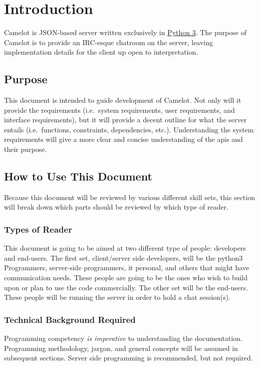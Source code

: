 \chapter{Introduction}\label{introduction}
Camelot is JSON-based server written exclusively in \href{https://www.python.org/about/}{Python 3}. The purpose of Camelot is to provide an IRC-esque chatroom on the server, leaving implementation details for the client up open to interpretation.

\section{Purpose}\label{purpose}
This document is intended to guide development of Camelot. Not only will it provide the requirements (i.e.~system requirements, user requirements, and interface requirements), but it will provide a decent outline for what the server entails (i.e.~functions, constraints, dependencies, etc.). Understanding the system requirements will give a more clear and concise understanding of the \acrfull{apis} and their purpose.

\section{How to Use This Document}\label{how-to-use-this-document}
Because this document will be reviewed by various different skill sets, this section will break down which parts should be reviewed by which type of reader.

\subsection{Types of Reader}\label{types-of-reader}
This document is going to be aimed at two different type of people: developers and end-users. The first set, client/server side developers, will be the \gls{python}3 Programmers, server-side programmers, \acrfull{it} personal, and others that might have communication needs. These people are going to be the ones who wish to build upon or plan to use the code commercially. The other set will be the end-users. These people will be running the server in order to hold a chat session(s).

\subsection{Technical Background
Required}\label{technical-background-required} Programming competency \emph{is imperative} to understanding the documentation. Programming methodology, jargon, and general concepts will be assumed in subsequent sections. Server side programming is recommended, but not required.

